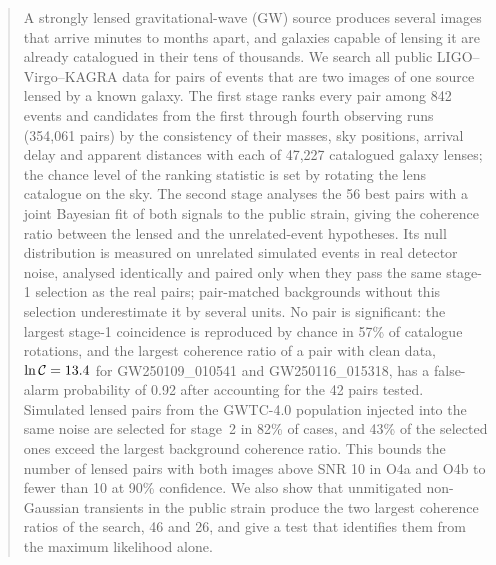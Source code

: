 \begin{abstract}
A strongly lensed gravitational-wave (GW) source produces several images that arrive minutes to months apart, and galaxies capable of lensing it are already catalogued in their tens of thousands. We search all public LIGO--Virgo--KAGRA data for pairs of events that are two images of one source lensed by a known galaxy. The first stage ranks every pair among 842 events and candidates from the first through fourth observing runs (354,061 pairs) by the consistency of their masses, sky positions, arrival delay and apparent distances with each of 47,227 catalogued galaxy lenses; the chance level of the ranking statistic is set by rotating the lens catalogue on the sky. The second stage analyses the 56 best pairs with a joint Bayesian fit of both signals to the public strain, giving the coherence ratio between the lensed and the unrelated-event hypotheses. Its null distribution is measured on unrelated simulated events in real detector noise, analysed identically and paired only when they pass the same stage-1 selection as the real pairs; pair-matched backgrounds without this selection underestimate it by several units. No pair is significant: the largest stage-1 coincidence is reproduced by chance in 57\% of catalogue rotations, and the largest coherence ratio of a pair with clean data, $\lnC=13.4$ for GW250109\_010541 and GW250116\_015318, has a false-alarm probability of 0.92 after accounting for the 42 pairs tested. Simulated lensed pairs from the GWTC-4.0 population injected into the same noise are selected for stage~2 in 82\% of cases, and 43\% of the selected ones exceed the largest background coherence ratio. This bounds the number of lensed pairs with both images above SNR 10 in O4a and O4b to fewer than 10 at 90\% confidence. We also show that unmitigated non-Gaussian transients in the public strain produce the two largest coherence ratios of the search, 46 and 26, and give a test that identifies them from the maximum likelihood alone.
\end{abstract}
